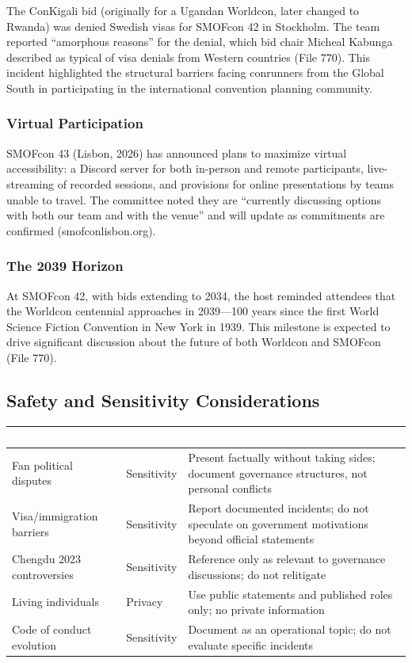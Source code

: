 \documentclass[11pt,letterpaper]{article}
\newcommand{\tableheader}[1]{\textbf{\sffamily\textcolor{white}{#1}}}
\begin{document}
The ConKigali bid (originally for a Ugandan Worldcon, later changed to Rwanda) was denied Swedish visas for SMOFcon 42 in Stockholm. The team reported ``amorphous reasons'' for the denial, which bid chair Micheal Kabunga described as typical of visa denials from Western countries (File 770). This incident highlighted the structural barriers facing conrunners from the Global South in participating in the international convention planning community.

\subsubsection{Virtual Participation}

SMOFcon 43 (Lisbon, 2026) has announced plans to maximize virtual accessibility: a Discord server for both in-person and remote participants, live-streaming of recorded sessions, and provisions for online presentations by teams unable to travel. The committee noted they are ``currently discussing options with both our team and with the venue'' and will update as commitments are confirmed (smofconlisbon.org).

\subsubsection{The 2039 Horizon}

At SMOFcon 42, with bids extending to 2034, the host reminded attendees that the Worldcon centennial approaches in 2039---100 years since the first World Science Fiction Convention in New York in 1939. This milestone is expected to drive significant discussion about the future of both Worldcon and SMOFcon (File 770).

\subsection{Safety and Sensitivity Considerations}

\begin{center}
\begin{tabularx}{\textwidth}{L{3cm}L{2cm}X}
\toprule
{}
\tableheader{Area} & \tableheader{Type} & \tableheader{Handling} \\
\midrule
Fan political disputes & Sensitivity & Present factually without taking sides; document governance structures, not personal conflicts \\
Visa/immigration barriers & Sensitivity & Report documented incidents; do not speculate on government motivations beyond official statements \\
Chengdu 2023 controversies & Sensitivity & Reference only as relevant to governance discussions; do not relitigate \\
Living individuals & Privacy & Use public statements and published roles only; no private information \\
Code of conduct evolution & Sensitivity & Document as an operational topic; do not evaluate specific incidents \\
\bottomrule
\end{tabularx}
\end{center}
\end{document}
